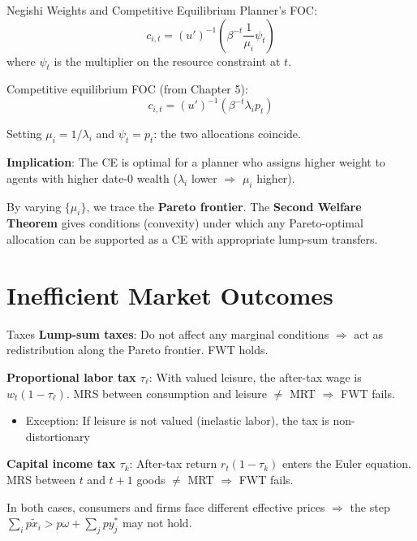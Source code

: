 \documentclass[blue]{beamer}
\begin{document}
\begin{frame}{Negishi Weights and Competitive Equilibrium}
	Planner's FOC:
	\[
	c_{i,t} = (u')^{-1}\!\left(\beta^{-t} \frac{1}{\mu_i} \psi_t\right)
	\]
	where $\psi_t$ is the multiplier on the resource constraint at $t$.
	
	\bigskip
	Competitive equilibrium FOC (from Chapter 5):
	\[
	c_{i,t} = (u')^{-1}\!\left(\beta^{-t} \lambda_i p_t\right)
	\]
	
	Setting $\mu_i = 1/\lambda_i$ and $\psi_t = p_t$: the two allocations coincide.
	
	\textbf{Implication}: The CE is optimal for a planner who assigns higher weight to agents with higher date-0 wealth ($\lambda_i$ lower $\Rightarrow$ $\mu_i$ higher).
	

	By varying $\{\mu_i\}$, we trace the \textbf{Pareto frontier}. The \textbf{Second Welfare Theorem} gives conditions (convexity) under which any Pareto-optimal allocation can be supported as a CE with appropriate lump-sum transfers.
\end{frame}

\section{Inefficient Market Outcomes}

\begin{frame}{Taxes}
	\textbf{Lump-sum taxes}: Do not affect any marginal conditions $\Rightarrow$ act as redistribution along the Pareto frontier. FWT holds.
	

	\textbf{Proportional labor tax $\tau_\ell$}: With valued leisure, the after-tax wage is $w_t(1-\tau_\ell)$. MRS between consumption and leisure $\neq$ MRT $\Rightarrow$ FWT fails.
	\begin{itemize}
		\item Exception: If leisure is not valued (inelastic labor), the tax is non-distortionary
	\end{itemize}
	

	\textbf{Capital income tax $\tau_k$}: After-tax return $r_t(1-\tau_k)$ enters the Euler equation. MRS between $t$ and $t+1$ goods $\neq$ MRT $\Rightarrow$ FWT fails.
	

	In both cases, consumers and firms face different effective prices $\Rightarrow$ the step $\sum_i p\tilde{x}_i > p\omega + \sum_j py_j^*$ may not hold.
\end{frame}
\end{document}
